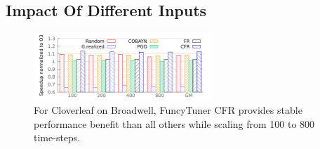 \subsection{Impact Of Different Inputs} \label{inputsensitivity}
\begin{figure}
\centering
\includegraphics[width=0.6\textwidth]{gnuplot_temp/scale_CL.pdf}
\caption{For Cloverleaf on Broadwell, FuncyTuner CFR provides stable performance benefit than all others while scaling from 100 to 800 time-steps.}
\label{fig:cl}
\end{figure}

